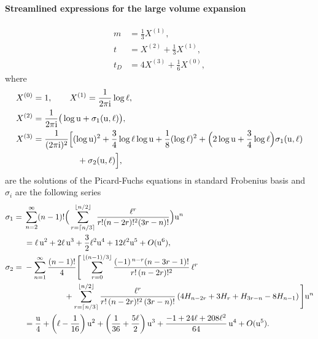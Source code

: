\documentclass[11pt, a4paper]{article}
\newcommand{\ii}{\mathrm{i}}
\newcommand{\ur}{\mathrm{u}}
\DeclarePairedDelimiter{\ceil}{\lceil}{\rceil}
\DeclarePairedDelimiter{\floor}{\lfloor}{\rfloor}
\numberwithin{equation}{section}
\begin{document}
\paragraph{Streamlined expressions for the large volume expansion}

\begin{align}
  m &= \frac{1}{3} X^{(1)}, \\
  t &= X^{(2)} + \frac{1}{3} X^{(1)}, \\
  t_D &= 4 X^{(3)} + \frac{1}{6} X^{(0)},
\end{align}
where
\begin{align}
  X^{(0)} &= 1, \qquad X^{(1)} = \frac{1}{2\pi \ii} \log \ell, \\
  X^{(2)} &= \frac{1}{2\pi\ii} \big(\log \ur + \sigma_1(\ur, \ell) \big), \\
  X^{(3)} &= \begin{aligned}[t]
    \frac{1}{(2\pi\ii)^2} & \Bigl[ (\log\ur)^2 + \frac34 \log \ell \log \ur + \frac18 (\log \ell)^2 
    + \Big( 2 \log \ur + \frac34 \log \ell \Big)\sigma_1(\ur, \ell) \\
    &\quad + \sigma_2(\ur, \ell)  \Bigr],
  \end{aligned}
\end{align}
are the solutions of the Picard-Fuchs equations in standard Frobenius basis and $\sigma_i$ are the following series
\begin{align}
  \sigma_1 &= \begin{aligned}[t]
    &\sum_{n=2}^{\infty} (n-1)! \Big( \sum_{r = \ceil{n/3}}^{\floor{n/2}} \frac{\ell^r}{r! (n-2r)!^2 (3r-n)!} \Big) \ur^n \\
    &= \ell \,\ur^{2} + 2\ell \,\ur^{3} + \frac{3}{2}\ell^{2}\ur^{4} + 12\ell^{2}\ur^{5} + O(\ur^{6}),
  \end{aligned} \\
  \sigma_2 &= \begin{aligned}[t]
    &-\sum_{n=1}^{\infty} \frac{(n-1)!}{4}\Bigg[
    \sum_{r=0}^{\left\lfloor (n-1)/3 \right\rfloor}
    \frac{(-1)^{\,n-r}(n-3r-1)!}{r!\,(n-2r)!^2}\,\ell^r
    \\
    &\qquad\qquad\quad
    +\sum_{r=\left\lceil n/3 \right\rceil}^{\left\lfloor n/2 \right\rfloor}
    \frac{\ell^r}{r!\,(n-2r)!^2\,(3r-n)!}
    \left(
    4H_{n-2r}+3H_r+H_{3r-n}-8H_{n-1}
    \right)
    \Bigg] \ur^n \\
    &= \frac{\ur}{4}
      +\left(\ell-\frac{1}{16}\right)\ur^{2}
      +\left(\frac{1}{36}+\frac{5\ell}{2}\right)\ur^{3}
      +\frac{-1+24\ell+208\ell^{2}}{64}\,\ur^{4}
      +O(\ur^{5}).
  \end{aligned}
\end{align}
\end{document}
